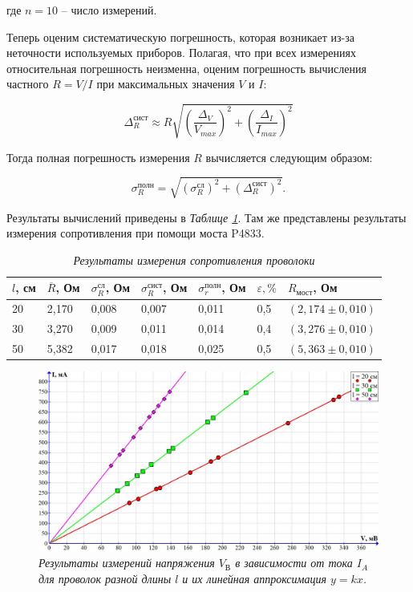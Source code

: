 \documentclass[a4paper,12pt]{article} %
\begin{document}
где $ n = 10 $ -- число измерений.

Теперь оценим систематическую погрешность, которая возникает из-за неточности используемых приборов. Полагая, что при всех измерениях относительная погрешность неизменна, оценим погрешность вычисления частного $ R = V / I $ при максимальных значения $ V $ и $ I $:

\begin{equation}
\Delta^\text{сист}_R \approx R\sqrt{\left( \frac{\Delta_V}{V_{max}} \right)^2 + \left( \frac{\Delta_I}{I_{max}} \right)^2  }
\end{equation}

Тогда полная погрешность измерения $ R $ вычисляется следующим образом:

\begin{equation}
\sigma^\text{полн}_R = \sqrt{\left( \sigma^\text{сл}_R \right)^2 + \left( \Delta_R^\text{сист} \right)^2 }.
\end{equation}

\label{chetire}

Результаты вычислений приведены в \textit{Таблице \ref{tab:rezult}}. Там же представлены результаты измерения сопротивления при помощи моста P4833.

\begin{table}[h]
	\begin{tabular}{|l|l|l|l|l|l|l|}
		\hline
		$l$, см & $\overline{R}$, Ом & $ \sigma_R^\text{сл} $, Ом & $ \sigma_R^\text{сист} $, Ом & $ \sigma_r^\text{полн} $, Ом & $ \varepsilon, \% $ & $ R_\text{мост} $, Ом \\ \hline
		20 & 2,170 & 0,008 & 0,007 & 0,011 & 0,5 & $ (2,174 \pm 0,010) $ \\ \hline
		30 & 3,270 & 0,009 & 0,011 & 0,014 & 0,4 & $ (3,276 \pm 0,010) $ \\ \hline
		50 & 5,382 & 0,017 & 0,018 & 0,025 & 0,5 & $ (5,363 \pm 0,010) $ \\ \hline
	\end{tabular}
\caption{\textit{Результаты измерения сопротивления проволоки}}
\label{tab:rezult}
\end{table}



\begin{figure}[h!]
	\includegraphics[width=1\linewidth]{gr.jpeg}
	\caption{\textit{Результаты измерений напряжения $ V_\text{В} $ в зависимости от тока $ I_A $ для проволок разной длины $ l $ и их линейная аппроксимация $ y=kx $.}}
	\label{graph}
\end{figure}
	
\end{document}

